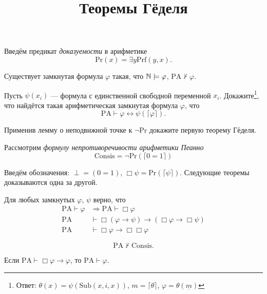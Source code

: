 \documentclass[a4paper, 12pt, num=Г5]{listok}
\renewcommand{\phi}{\varphi}
\begin{document}
\title{Теоремы Гёделя}
\maketitle
\begin{definition}
	Введём предикат \textit{доказуемости} в арифметике
	\[
		\mathrm{Pr}(x) = \exists y \mathrm{Prf}(y, x).
	\]
\end{definition}
\begin{theorem}
	Существует замкнутая формула $\phi$ такая, что $\N \models \phi$, $\mathrm{PA} \not \vdash \phi$.
\end{theorem}
\begin{problem}
	Пусть $\psi(x_i)$ --- формула с единственной свободной переменной $x_i$.
	Докажите\footnote{Ответ: $\theta(x) = \psi(\mathrm{Sub}(x,i,x))$, $m = \lceil \theta \rceil$, $\phi = \theta(\underline m)$},
	что найдётся такая арифметическая замкнутая формула $\phi$, что
	\[
		\mathrm{PA} \vdash \phi \leftrightarrow \psi(\lceil \phi \rceil).
	\]
\end{problem}
\begin{problem}
	Применив лемму о неподвижной точке к $\neg \mathrm{Pr}$ докажите первую теорему Гёделя.
\end{problem}
\begin{definition}
	Рассмотрим \textit{формулу непротиворечивости арифметики Пеанно}
	\[
		\mathrm{Consis} = \neg \mathrm{Pr}(\lceil 0 = 1 \rceil)
	\]
\end{definition}
Введём обозначения: $\perp = (0 = 1)$, $\Box \psi = \mathrm{Pr}(\lceil \psi \rceil)$.
Следующие теоремы доказываются одна за другой.
\begin{theorem}
	Для любых замкнутых $\phi$, $\psi$ верно, что
	\begin{align*}
		\mathrm{PA} \vdash \phi &\Rightarrow \mathrm{PA} \vdash \Box \phi \\
		\mathrm{PA} &\vdash \Box(\phi \to \psi) \to (\Box \phi \to \Box \psi) \\
		\mathrm{PA} &\vdash \Box \phi \to \Box \Box \phi
	\end{align*}
\end{theorem}
\begin{theorem}
	\[
		\mathrm{PA} \not \vdash \mathrm{Consis}.
	\]
\end{theorem}
\begin{theorem}[Леб]
	Если $\mathrm{PA} \vdash \Box \phi \to \phi$, то $\mathrm {PA} \vdash \phi$.
\end{theorem}
\end{document}
